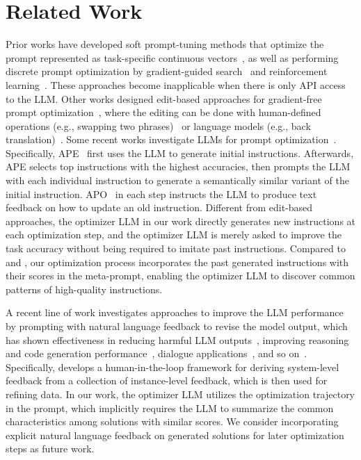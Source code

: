 \section{Related Work}
\label{sec:work}

 Prior works have developed soft prompt-tuning methods that optimize the prompt represented as task-specific continuous vectors~\citep{lester2021power,li2021prefix,liu2021gpt,qin2021learning}, as well as performing discrete prompt optimization by gradient-guided search~\citep{shin2020autoprompt,wen2023hard,gao2020making,chen2023instructzero} and reinforcement learning~\citep{deng2022rlprompt,zhang2022tempera}. 
These approaches become inapplicable when there is only API access to the LLM. 
Other works designed edit-based approaches for gradient-free prompt optimization~\citep{xu2022gps,prasad2022grips}, where the editing can be done with human-defined operations (e.g., swapping two phrases)~\citep{prasad2022grips} or language models (e.g., back translation)~\citep{xu2022gps}. 
Some recent works investigate LLMs for prompt optimization~\citep{zhou2022large,pryzant2023automatic,xu2023wizardlm}. 
Specifically, APE~\citep{zhou2022large} first uses the LLM to generate initial instructions. Afterwards, APE selects top instructions with the highest accuracies, then prompts the LLM with each individual instruction to generate a semantically similar variant of the initial instruction.
APO~\citep{pryzant2023automatic} in each step instructs the LLM to produce text feedback on how to update an old instruction. 
Different from edit-based approaches, the optimizer LLM in our work directly generates new instructions at each optimization step, and the optimizer LLM is merely asked to improve the task accuracy without being required to imitate past instructions. Compared to \citet{zhou2022large} and \citet{pryzant2023automatic}, our optimization process incorporates the past generated instructions with their scores in the meta-prompt, enabling the optimizer LLM to discover common patterns of high-quality instructions.

 A recent line of work investigates approaches to improve the LLM performance by prompting with natural language feedback to revise the model output, which has shown effectiveness in reducing harmful LLM outputs~\citep{bai2022constitutional,ganguli2023capacity}, improving reasoning~\citep{shinn2023reflexion,madaan2023self} and code generation performance~\citep{chen2023teaching,olausson2023demystifying,shinn2023reflexion,chen2023improving}, dialogue applications~\citep{nair2023dera,madaan2023self,yuan2023system}, and so on~\citep{kim2023language,wang2023voyager}. Specifically, \citet{yuan2023system} develops a human-in-the-loop framework for deriving system-level feedback from a collection of instance-level feedback, which is then used for refining data. In our work, the optimizer LLM utilizes the optimization trajectory in the prompt, which implicitly requires the LLM to summarize the common characteristics among solutions with similar scores. We consider incorporating explicit natural language feedback on generated solutions for later optimization steps as future work.

